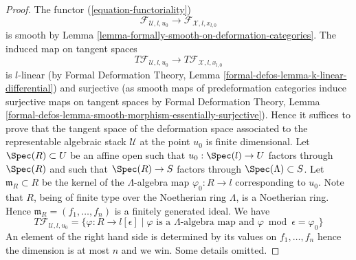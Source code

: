 \begin{proof}
\medskip\noindent
The functor (\ref{equation-functoriality})
$$
\mathcal{F}_{\mathcal{U}, l, u_0}
\longrightarrow
\mathcal{F}_{\mathcal{X}, l, x_{l, 0}}
$$
is smooth by Lemma \ref{lemma-formally-smooth-on-deformation-categories}.
The induced map on tangent spaces
$$
T\mathcal{F}_{\mathcal{U}, l, u_0}
\longrightarrow
T\mathcal{F}_{\mathcal{X}, l, x_{l, 0}}
$$
is $l$-linear (by
Formal Deformation Theory, Lemma
\ref{formal-defos-lemma-k-linear-differential})
and surjective (as smooth maps of predeformation categories induce
surjective maps on tangent spaces by
Formal Deformation Theory, Lemma
\ref{formal-defos-lemma-smooth-morphism-essentially-surjective}).
Hence it suffices to prove that the tangent space of the deformation
space associated to the representable algebraic stack $\mathcal{U}$
at the point $u_0$ is finite dimensional. Let $\Spec(R) \subset U$ be
an affine open such that $u_0 : \Spec(l) \to U$ factors through $\Spec(R)$
and such that $\Spec(R) \to S$ factors through $\Spec(\Lambda) \subset S$.
Let $\mathfrak m_R \subset R$ be the kernel of the $\Lambda$-algebra map
$\varphi_0 : R \to l$ corresponding to $u_0$. Note that $R$, being of finite
type over the Noetherian ring $\Lambda$, is a Noetherian ring. Hence
$\mathfrak m_R = (f_1, \ldots, f_n)$ is a finitely generated ideal.
We have
$$
T\mathcal{F}_{\mathcal{U}, l, u_0}
=
\{\varphi : R \to l[\epsilon] \mid
\varphi \text{ is a } \Lambda\text{-algebra map and }
\varphi \bmod \epsilon = \varphi_0\}
$$
An element of the right hand side is determined by its values on
$f_1, \ldots, f_n$ hence the dimension is at most $n$ and we win.
Some details omitted.
\end{proof}
